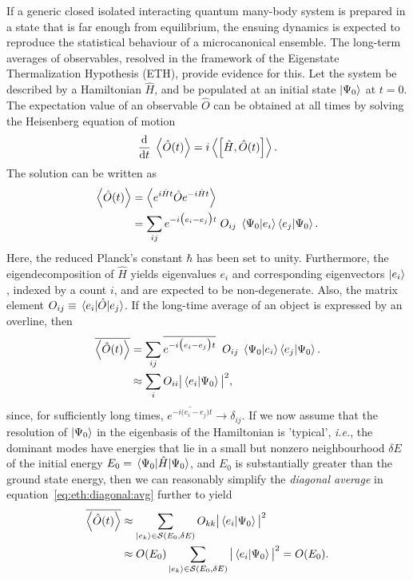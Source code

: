 \documentclass[%
 reprint,
superscriptaddress,
 amsmath,amssymb,
 aps,
prb,
]{revtex4-2}
\begin{document}
If a generic closed isolated interacting quantum many-body system is prepared in a state that is far enough from equilibrium, the ensuing dynamics is expected to reproduce the statistical behaviour of a microcanonical ensemble. The long-term averages of observables, resolved in the framework of the Eigenstate Thermalization Hypothesis (ETH), provide evidence for this. Let the system be described by a Hamiltonian $\hat{H}$, and be populated at an initial state $\ket{\Psi_0}$ at $t=0$. The expectation value of an observable $\hat{O}$ can be obtained at all times by solving the Heisenberg equation of motion
\begin{equation}
\dv{t}\;\ev{\hat{O}(t)} = i \ev{\comm\Big{\hat{H}}{\hat{O}(t)}}.
\end{equation}
The solution can be written as
\begin{align}
\expval{\hat{O}(t)} &= \expval{ e^{i\hat{H}t}\hat{O}e^{-i\hat{H}t}}\nonumber\\
&= \sum_{ij}e^{-i\big(e_i-e_j\big)t}\;O_{ij}\;\ip{\Psi_0}{e_i}\ip{e_j}{\Psi_0}.
\end{align}
Here, the reduced Planck's constant $\hbar$ has been set to unity. Furthermore, the eigendecomposition of $\hat{H}$ yields eigenvalues $e_i$ and corresponding eigenvectors $\ket{e_i}$, indexed by a count $i$, and are expected to be non-degenerate. Also, the matrix element $O_{ij}\equiv \mel{e_i}{\hat{O}}{e_j}$. If the long-time average of an object is expressed by an overline, then
\begin{align}
\overline{\ev{\hat{O}(t)}} &= \sum_{ij}\overline{e^{-i\big(e_i-e_j\big)t}}\;\;O_{ij}\; \ip{\Psi_0}{e_i}\ip{e_j}{\Psi_0}.\nonumber\\
\label{eq:eth:diagonal:avg}
&\approx\sum_i O_{ii}\big\vert \ip{e_i}{\Psi_0} \big\vert^2,
\end{align}
since, for sufficiently long times, $\overline{e^{-i\big(e_i-e_j\big)t}}\rightarrow \delta_{ij}$. If we now assume that  the resolution of $\ket{\Psi_0}$ in the eigenbasis of the Hamiltonian is 'typical', \textit{i.e.}, the dominant modes have energies that lie in a small but nonzero neighbourhood $\delta E$ of the initial energy $E_0 = \expval{\hat{H}}{\Psi_0}$, and $E_0$ is substantially greater than the ground state energy, then we can reasonably simplify the \textit{diagonal average} in equation~\ref{eq:eth:diagonal:avg} further to yield
\begin{align}
	\label{eq:eth:final}
\overline{\ev{\hat{O}(t)}} &\approx \sum_{\ket{e_k}\in \mathcal{S}(E_0, \delta E)}O_{kk}\big\vert \ip{e_i}{\Psi_0} \big\vert^2\nonumber\\
&\approx O(E_0) \sum_{\ket{e_k}\in \mathcal{S}(E_0, \delta E)}\big\vert \ip{e_i}{\Psi_0} \big\vert^2 = O(E_0).
\end{align}
\end{document}
